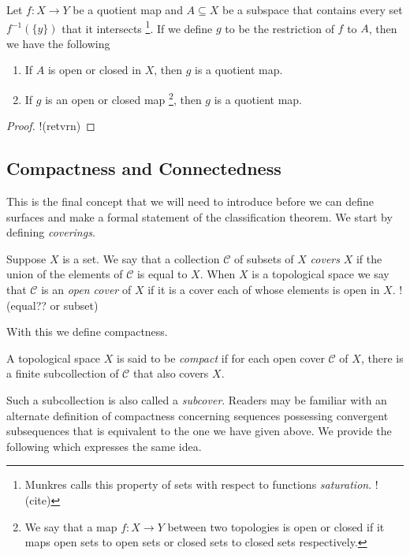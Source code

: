 \begin{thm}
  Let $f:X \rightarrow Y$ be a quotient map and $A \subseteq X$ be a
  subspace that contains every set $f^{-1}(\{ y \})$ that it
  intersects \footnote{Munkres calls this property of sets with
    respect to functions \emph{saturation}. !(cite)}. If we define $g$
  to be the restriction of $f$ to $A$, then we have the following
  \begin{enumerate}
  \item If $A$ is open or closed in $X$, then $g$ is a quotient map.
  \item If $g$ is an open or closed map \footnote{We say that a map
      $f:X \rightarrow Y$ between two topologies is open or closed if
      it maps open sets to open sets or closed sets to closed sets
      respectively.}, then $g$ is a quotient map.
  \end{enumerate}
\end{thm}

\begin{proof}
  !(retvrn)
\end{proof}

\subsection{Compactness and Connectedness}
\label{sec:prelims:compact}

This is the final concept that we will need to introduce before we can
define surfaces and make a formal statement of the classification
theorem. We start by defining \emph{coverings}.

\begin{defn}
  Suppose $X$ is a set. We say that a collection $\mathscr{C}$ of
  subsets of $X$ \emph{covers} $X$ if the union of the elements of
  $\mathscr{C}$ is equal to $X$. When $X$ is a topological space we
  say that $\mathscr{C}$ is an \emph{open cover} of $X$ if it is a
  cover each of whose elements is open in $X$. !(equal?? or subset)
\end{defn}

With this we define compactness.

\begin{defn}
  A topological space $X$ is said to be \emph{compact} if for each
  open cover $\mathscr{C}$ of $X$, there is a finite subcollection of
  $\mathscr{C}$ that also covers $X$.
\end{defn}

Such a subcollection is also called a \emph{subcover}. Readers may be
familiar with an alternate definition of compactness concerning
sequences possessing convergent subsequences that is equivalent to the
one we have given above. We provide the following which expresses the
same idea.

